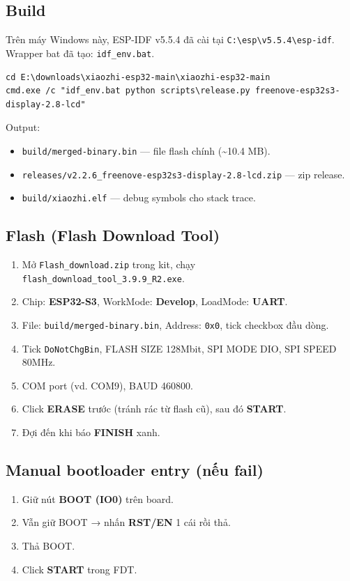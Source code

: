 \documentclass[11pt,a4paper]{article}
\begin{document}
\subsection{Build}
Trên máy Windows này, ESP-IDF v5.5.4 đã cài tại \texttt{C:\textbackslash esp\textbackslash v5.5.4\textbackslash esp-idf}. Wrapper bat đã tạo: \texttt{idf\_env.bat}.

\begin{lstlisting}[caption={Lệnh build}]
cd E:\downloads\xiaozhi-esp32-main\xiaozhi-esp32-main
cmd.exe /c "idf_env.bat python scripts\release.py freenove-esp32s3-display-2.8-lcd"
\end{lstlisting}

Output:
\begin{itemize}
  \item \texttt{build/merged-binary.bin} — file flash chính (\textasciitilde 10.4 MB).
  \item \texttt{releases/v2.2.6\_freenove-esp32s3-display-2.8-lcd.zip} — zip release.
  \item \texttt{build/xiaozhi.elf} — debug symbols cho stack trace.
\end{itemize}

\subsection{Flash (Flash Download Tool)}
\begin{enumerate}
  \item Mở \texttt{Flash\_download.zip} trong kit, chạy \texttt{flash\_download\_tool\_3.9.9\_R2.exe}.
  \item Chip: \textbf{ESP32-S3}, WorkMode: \textbf{Develop}, LoadMode: \textbf{UART}.
  \item File: \texttt{build/merged-binary.bin}, Address: \texttt{0x0}, tick checkbox đầu dòng.
  \item Tick \texttt{DoNotChgBin}, FLASH SIZE 128Mbit, SPI MODE DIO, SPI SPEED 80MHz.
  \item COM port (vd. COM9), BAUD 460800.
  \item Click \textbf{ERASE} trước (tránh rác từ flash cũ), sau đó \textbf{START}.
  \item Đợi đến khi báo \textbf{FINISH} xanh.
\end{enumerate}

\subsection{Manual bootloader entry (nếu fail)}
\begin{enumerate}
  \item Giữ nút \textbf{BOOT (IO0)} trên board.
  \item Vẫn giữ BOOT → nhấn \textbf{RST/EN} 1 cái rồi thả.
  \item Thả BOOT.
  \item Click \textbf{START} trong FDT.
\end{enumerate}
\end{document}
